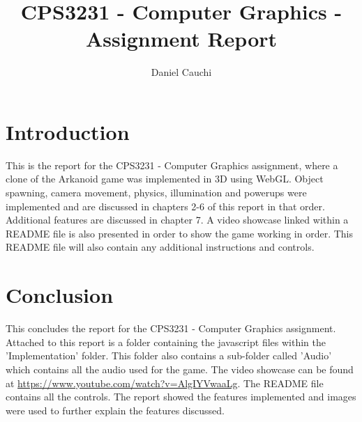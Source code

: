 \documentclass{report}
\begin{document}
\title{CPS3231  - Computer Graphics - Assignment Report}
\author{Daniel Cauchi}
\date{}
\maketitle

\tableofcontents

\chapter{Introduction}
This is the report for the CPS3231 - Computer Graphics assignment, where a clone of the Arkanoid game was implemented in 3D using WebGL. Object spawning, camera movement, physics, illumination and powerups were implemented and are discussed in chapters 2-6 of this report in that order. Additional features are discussed in chapter 7. A video showcase linked within a README file is also presented in order to show the game working in order. This README file will also contain any additional instructions and controls.


\pagebreak

\pagebreak

\pagebreak

\pagebreak

\pagebreak

\pagebreak

\chapter{Conclusion}
This concludes the report for the CPS3231 - Computer Graphics assignment. Attached to this report is a folder containing the javascript files within the 'Implementation' folder. This folder also contains a sub-folder called 'Audio' which contains all the audio used for the game. The video showcase can be found at \url{https://www.youtube.com/watch?v=AlgIYVwaaLg}. The README file contains all the controls. The report showed the features implemented and images were used to further explain the features discussed.

\pagebreak

\pagebreak

\end{document}

